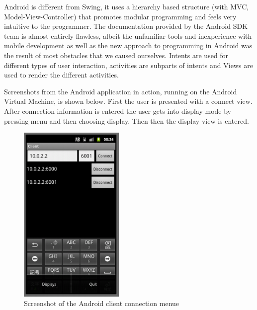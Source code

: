 \documentclass[8pt,titlepage]{article}
\begin{document}
Android is different from Swing, it uses a hierarchy based structure (with MVC, Model-View-Controller) that promotes modular programming and feels very intuitive to the programmer. The documentation provided by the Android SDK team is almost entirely flawless, albeit the unfamiliar tools and inexperience with mobile development as well as the new approach to programming in Android was the result of most obstacles that we caused ourselves.
Intents are used for different types of user interaction, activities are subparts of intents and Views are used to render the different activities. 

Screenshots from the Android application in action, running on the Android Virtual Machine, is shown below. First the user is presented with a connect view. After connection information is entered the user gets into display mode by pressing menu and then choosing display. Then then the display view is entered.

\begin{figure}[hbp]
\centering
\includegraphics[width=0.45\textwidth]{../screenshots/androidConnecting.png}
\caption{Screenshot of the Android client connection menue}
\end{figure}
\end{document}
